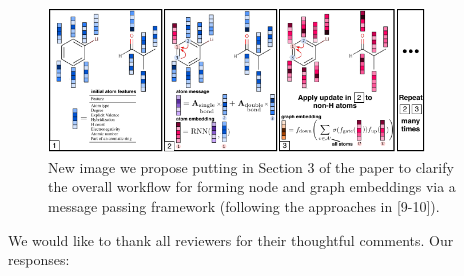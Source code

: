 \documentclass{article}
\begin{document}


\begin{figure}
\centering
\vspace{-1pt}
  \includegraphics[width=10cm]{graph_nn.pdf}
  \vspace{-20pt}
 \caption{New image we propose putting in Section 3 of the paper to clarify the overall workflow for forming node and graph embeddings via a message passing framework (following the approaches in [9-10]).}
 \label{fig:new-diagram}
 \vspace{-5ex}
\end{figure}

We would like to thank all reviewers for their thoughtful comments. 
Our responses:
\end{document}

